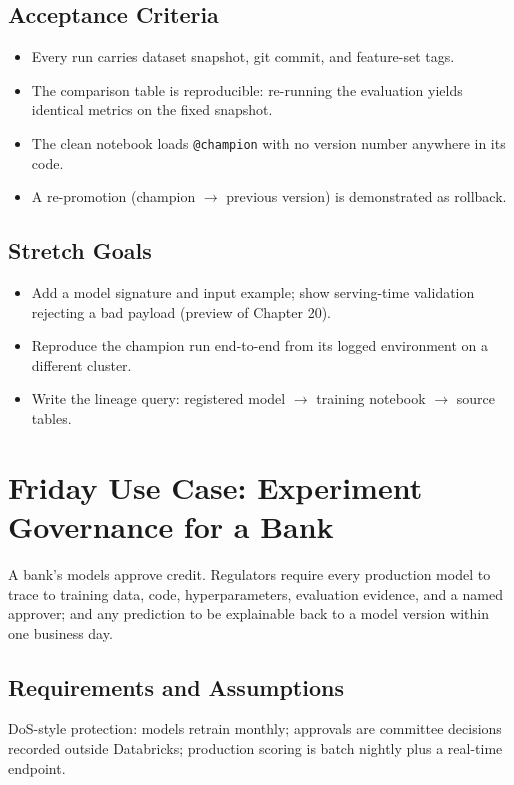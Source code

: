 \subsection*{Acceptance Criteria}
\begin{itemize}
    \item Every run carries dataset snapshot, git commit, and feature-set tags.
    \item The comparison table is reproducible: re-running the evaluation yields identical metrics on the fixed snapshot.
    \item The clean notebook loads \texttt{@champion} with no version number anywhere in its code.
    \item A re-promotion (champion $\rightarrow$ previous version) is demonstrated as rollback.
\end{itemize}

\subsection*{Stretch Goals}
\begin{itemize}
    \item Add a model signature and input example; show serving-time validation rejecting a bad payload (preview of Chapter 20).
    \item Reproduce the champion run end-to-end from its logged environment on a different cluster.
    \item Write the lineage query: registered model $\rightarrow$ training notebook $\rightarrow$ source tables.
\end{itemize}

\section{Friday Use Case: Experiment Governance for a Bank}
A bank's models approve credit. Regulators require every production model to trace to training data, code, hyperparameters, evaluation evidence, and a named approver; and any prediction to be explainable back to a model version within one business day.

\subsection{Requirements and Assumptions}
DoS-style protection: models retrain monthly; approvals are committee decisions recorded outside Databricks; production scoring is batch nightly plus a real-time endpoint.

